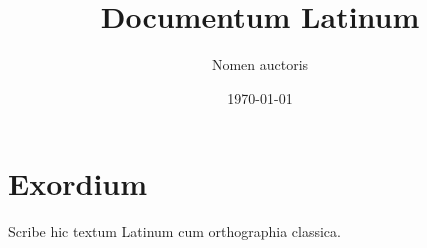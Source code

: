 \documentclass[11pt,a4paper]{article}
\title{Documentum Latinum}
\author{Nomen auctoris}
\date{\today}
\begin{document}
\maketitle
\section{Exordium}
Scribe hic textum Latinum cum orthographia classica.
\end{document}
